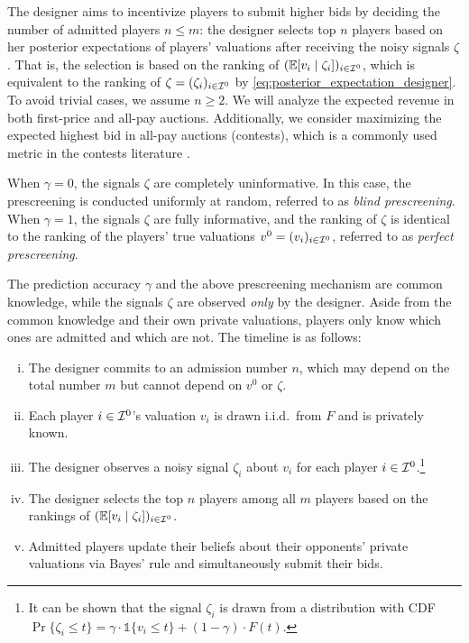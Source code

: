 The designer aims to incentivize players to submit higher bids by deciding the number of admitted players $n \leq m$: the designer selects top $n$ players based on her posterior expectations of players' valuations after receiving the noisy signals $\zeta$. That is, the selection is based on the ranking of $(\mathbb{E}[v_i\mid \zeta_i])_{i\in \mathcal{I}^0}$, which is equivalent to the ranking of $\zeta=(\zeta_i)_{i\in \mathcal{I}^0}$ by \eqref{eq:posterior_expectation_designer}.
To avoid trivial cases, we assume $n\geq 2$.
We will analyze the expected revenue in both first-price and all-pay auctions. Additionally, we consider maximizing the expected highest bid in all-pay auctions (contests), which is a commonly used metric in the contests literature \citep{moldovanu_2006_contest_architecture,Jason_Optimal_Crowdsourcing_Contest}.

When $\gamma = 0$, the signals $\zeta$ are completely uninformative. In this case, the prescreening is conducted uniformly at random, referred to as \emph{blind prescreening}. When $\gamma = 1$, the signals $\zeta$ are fully informative, and the ranking of $\zeta$ is identical to the ranking of the players' true valuations $v^0=(v_i)_{i\in \mathcal{I}^0}$, referred to as \emph{perfect prescreening}.

The prediction accuracy $\gamma$ and the above prescreening mechanism are common knowledge, while the signals $\zeta$ are observed \textit{only} by the designer.
Aside from the common knowledge and their own private valuations, players only know which ones are admitted and which are not. The timeline is as follows:
\begin{enumerate}[(i)]
    \item The designer commits to an admission number $n$, which may depend on the total number $m$ but cannot depend on $v^0$ or $\zeta$.
    \item Each player $i\in \mathcal{I}^0$’s valuation $v_i$ is drawn i.i.d.\ from $F$ and is privately known.
    \item The designer observes a noisy signal $\zeta_i$ about $v_i$ for each player $i\in \mathcal{I}^0$.\footnote{It can be shown that the signal $\zeta_i$ is drawn from a distribution with CDF $ \Pr\{\zeta_i\leq t\}=\gamma\cdot \mathds{1}\{v_i\leq t\}+(1-\gamma)\cdot F(t).$ }
    
    \item The designer selects the top $n$ players among all $m$ players based on the rankings of $(\mathbb{E}[v_i\mid \zeta_i])_{i\in \mathcal{I}^0}$.
    \item Admitted players update their beliefs about their opponents' private valuations via Bayes' rule and simultaneously submit their bids.
\end{enumerate}

